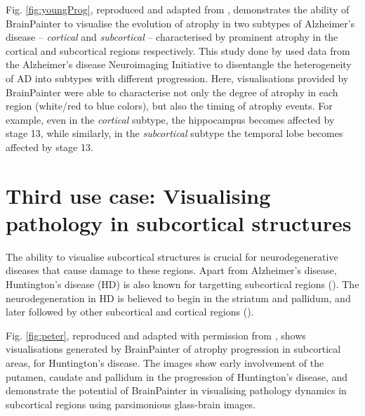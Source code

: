 \documentclass[final,times,twocolumn,authoryear]{elsarticle}
\begin{document}
Fig. \ref{fig:youngProg}, reproduced and adapted from \cite{young2018uncovering}, demonstrates the ability of BrainPainter to visualise the evolution of atrophy in two subtypes of Alzheimer's disease -- \emph{cortical} and \emph{subcortical} -- characterised by prominent atrophy in the cortical and subcortical regions respectively. This study done by \cite{young2018uncovering} used data from the Alzheimer's disease Neuroimaging Initiative to disentangle the heterogeneity of AD into subtypes with different progression. Here, visualisations provided by BrainPainter were able to characterise not only the degree of atrophy in each region (white/red to blue colors), but also the timing of atrophy events. For example, even in the \emph{cortical} subtype, the hippocampus becomes affected by stage 13, while similarly, in the \emph{subcortical} subtype the temporal lobe becomes affected by stage 13. 


\section{Third use case: Visualising pathology in subcortical structures}
\label{progression3}

The ability to visualise subcortical structures is crucial for neurodegenerative diseases that cause damage to these regions. Apart from Alzheimer's disease, Huntington's disease (HD) is also known for targetting subcortical regions (\cite{douaud2009vivo,wijeratne2018image}). The neurodegeneration in HD is believed to begin in the striatum and pallidum, and later followed by other subcortical and cortical regions (\cite{douaud2009vivo}).

Fig. \ref{fig:peter}, reproduced and adapted with permission from \cite{wijeratne2018image}, shows visualisations generated by BrainPainter of atrophy progression in subcortical areas, for Huntington's disease. The images show early involvement of the putamen, caudate and pallidum in the progression of Huntington's disease, and demonstrate the potential of BrainPainter in visualising pathology dynamics in subcortical regions using parsimonious glass-brain images.
\end{document}
